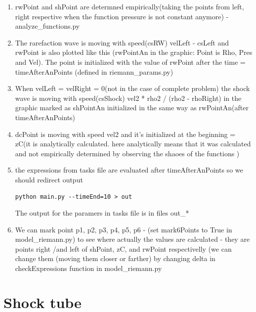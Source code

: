 \documentclass[12pt]{book}
\begin{document}
\begin{enumerate}
\item rwPoint and shPoint are determned empirically(taking the points from left, right respective when the function pressure is not constant anymore) - analyze\_functions.py
\item The rarefaction wave is moving  with speed(csRW) velLeft - csLeft and rwPoint is also plotted like this (rwPointAn in the graphic: Point is Rho, Pres and Vel). The point is initialized with the value of rwPoint after the time = timeAfterAnPoints (defined in riemann\_params.py)
\item When velLeft = velRight = 0(not in the case of complete problem) the shock wave is moving  with speed(csShock) vel2 * rho2 / (rho2 - rhoRight) in the graphic marked as shPointAn
initialized in the same way as rwPointAn(after timeAfterAnPoints)
\item dcPoint is moving with speed vel2 and it's initialized at the beginning = zC(it is analytically calculated. here analytically means that it was calculated and not empirically determined by observing the shaoes of the functions )
\item the expressions from tasks file are evaluated after timeAfterAnPoints so we should redirect output
\begin{verbatim}
python main.py --timeEnd=10 > out
\end{verbatim}
The output for the paramers in tasks file is in files out\_*
\item We can mark point p1, p2, p3, p4, p5, p6 - (set mark6Points to True in model\_riemann.py) to see where actually the values are calculated - they are points right /and left of shPoint, zC, and rwPoint respectivelly
(we can change them (moving them closer or farther) by changing  delta  in checkExpressions function in model\_riemann.py

\end{enumerate}
\section*{Shock tube}
\end{document}
